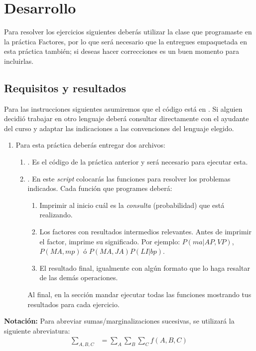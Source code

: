 \section{Desarrollo}

Para resolver los ejercicios siguientes deberás utilizar la clase que programaste en la práctica Factores, por lo que será necesario que la entregues empaquetada en esta práctica también; si deseas hacer correcciones es un buen momento para incluirlas.

\subsection{Requisitos y resultados}

Para las instrucciones siguientes asumiremos que el código está en .  Si alguien decidió trabajar en otro lenguaje deberá consultar directamente con el ayudante del curso y adaptar las indicaciones a las convenciones del lenguaje elegido.

\begin{enumerate}
 \item Para esta práctica deberás entregar dos archivos:
 \begin{enumerate}
  \item {}.  Es el código de la práctica anterior y será necesario para ejecutar esta.
  \item {}.  En este \textit{script} colocarás las funciones para resolver los problemas indicados.  Cada función que programes deberá:
  \begin{enumerate}
   \item Imprimir al inicio cuál es la \emph{consulta} (probabilidad) que está realizando.
   \item Los factores con resultados intermedios relevantes.  Antes de imprimir el factor, imprime su significado.  Por ejemplo: $P(ma|AP,VP)$, $P(MA,mp)$ ó $P(MA,JA)P(LI|bp)$.
   \item El resultado final, igualmente con algún formato que lo haga resaltar de las demás operaciones.
  \end{enumerate}
  Al final, en la sección  mandar ejecutar todas las funciones mostrando tus resultados para cada ejercicio.
 \end{enumerate}
\end{enumerate}

\textbf{Notación:} Para abreviar sumas/marginalizaciones sucesivas, se utilizará la siguiente abreviatura:
\begin{align*}
 \sum_{A,B,C} &= \sum_A \sum_B \sum_C f(A,B,C)
\end{align*}


